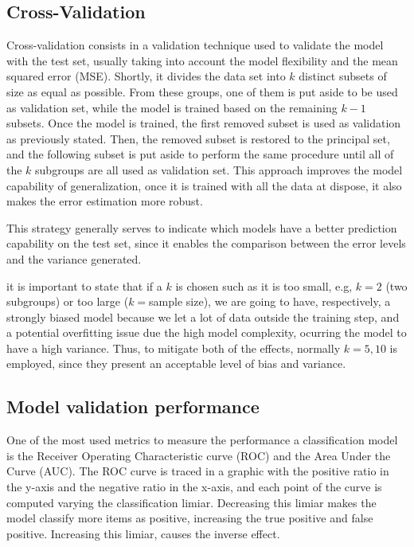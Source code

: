 \subsection{Cross-Validation}

Cross-validation consists in a validation technique used to validate the model with the
test set, usually taking into account the model flexibility and the mean squared error (MSE).
Shortly, it divides the data set into $k$ distinct subsets of size as equal as 
possible. From these groups, one of them is put aside to be used as validation set,
while the model is trained based on the remaining $k-1$ subsets. Once the model is trained,
the first removed subset is used as validation as previously stated. Then, the removed 
subset is restored to the principal set, and the following subset is put aside to 
perform the same procedure until all of the $k$ subgroups are all used as validation set. 
This approach improves the model capability of generalization, once it is trained with 
all the data at dispose, it also makes the error estimation more robust.

This strategy generally serves to indicate which models have a better prediction capability
on the test set, since it enables the comparison between the error levels and the variance
generated.

it is important to state that if a $k$ is chosen such as it is too small, e.g, $k=2$ 
(two subgroups) or too large ($k=$sample size), we are going to have, respectively, a 
strongly biased model because we let a lot of data outside the training step, and a potential
overfitting issue due the high model complexity, ocurring the model to have a high variance.
Thus, to mitigate both of the effects, normally $k=5,10$ is employed, since they present
an acceptable level of bias and variance.

\subsection{Model validation performance}

One of the most used metrics to measure the performance a classification model is the
Receiver Operating Characteristic curve (ROC) and the Area Under the Curve (AUC). 
The ROC curve is traced in a graphic with the positive ratio in the y-axis and the negative
ratio in the x-axis, and each point of the curve is computed varying the classification
limiar. Decreasing this limiar makes the model classify more items as positive, increasing
the true positive and false positive. Increasing this limiar, causes the inverse
effect.

